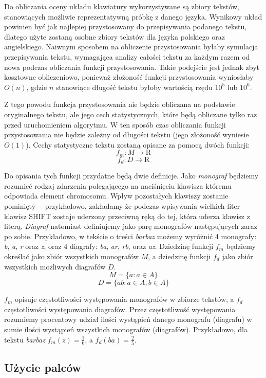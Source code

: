 \documentclass[brudnopis]{xmgr}
\begin{document}
Do obliczania oceny układu klawiatury wykorzystywane są zbiory tekstów, stanowiących możliwie reprezentatywną próbkę z danego języka. Wynikowy układ powinien być jak najlepiej przystosowany do przepisywania podanego tekstu, dlatego użyte zostaną osobne zbiory tekstów dla języka polskiego oraz angielskiego. Naiwnym sposobem na obliczenie przystosowania byłaby symulacja przepisywania tekstu, wymagająca analizy całości tekstu za każdym razem od nowa podczas obliczania funkcji przystosowania. Takie podejście jest jednak zbyt kosztowne obliczeniowo, ponieważ złożoność funkcji przystosowania wyniosłaby $ O(n) $, gdzie $ n $ stanowiące długość tekstu byłoby wartością rzędu $ 10^5 $ lub $ 10^6 $.

Z tego powodu funkcja przystosowania nie będzie obliczana na podstawie oryginalnego tekstu, ale jego cech statystycznych, które będą obliczane tylko raz przed uruchomieniem algorytmu. W ten sposób czas obliczania funkcji przystosowania nie będzie zależny od długości tekstu (jego złożoność wyniesie $ O(1) $). Cechy statystyczne tekstu zostaną opisane za pomocą dwóch funkcji:
$$ f_m : M \rightarrow \mathrm{R} $$
$$ f_d : D \rightarrow \mathrm{R} $$

Do opisania tych funkcji przydatne będą dwie definicje. Jako \emph{monograf} będziemy rozumieć rodzaj zdarzenia polegającego na naciśnięciu klawisza któremu odpowiada element chromosomu. Wpływ pozostałych klawiszy zostanie pominięty~-~przykładowo, zakładamy że podczas wpisywania wielkich liter klawisz SHIFT zostaje uderzony przeciwną ręką do tej, która uderza klawisz z literą. \emph{Diagraf} natomiast definiujemy jako parę monografów następujących zaraz po sobie. Przykładowo, w tekście o treści \emph{barbaz} możemy wyróżnić 4 monografy: \emph{b}, \emph{a}, \emph{r} oraz \emph{z}, oraz 4 diagrafy: \emph{ba}, \emph{ar}, \emph{rb}, oraz \emph{az}. Dziedzinę funkcji $ f_m $ będziemy określać jako zbiór wszystkich monografów $ M $, a dziedzinę funkcji $ f_d $ jako zbiór wszystkich możliwych diagrafów $ D $.
$$ M = \{ a : a \in A \} $$
$$ D = \{ ab : a \in A, b \in A \} $$

$ f_m $ opisuje częstotliwości występowania monografów w zbiorze tekstów, a $ f_d $ częstotliwości występowania diagrafów. Przez częstotliwość występowania rozumiemy procentowy udział ilości wystąpień danego monografu (diagrafu) w sumie ilości wystąpień wszystkich monografów (diagrafów). Przykładowo, dla tekstu \emph{barbaz} $ f_m(z) = \frac{1}{6} $, a $ f_d(ba) = \frac{2}{5} $.


\subsection{Użycie palców}
\end{document}
